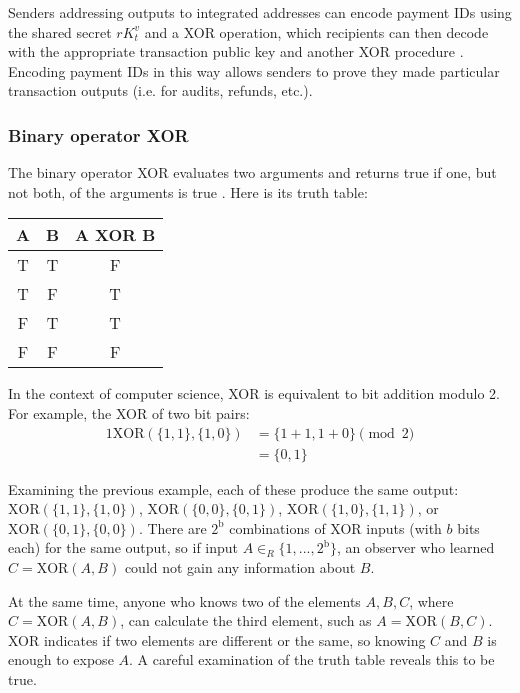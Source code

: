 Senders addressing outputs to integrated addresses can encode payment IDs using the shared secret $r K_t^v$ and a XOR operation, which recipients can then decode with the appropriate transaction public key and another XOR procedure \cite{integrated-addresses}. Encoding payment IDs in this way allows senders to prove they made particular transaction outputs (i.e. for audits, refunds, etc.).
    
\subsubsection*{Binary operator XOR}

The binary operator XOR evaluates two arguments and returns true if one, but not both, of the arguments is true \cite{wolfram-xor}. Here is its truth table:

\begin{center}
    \begin{tabular}{|c|c|c|}
    \hline
        A & B & A XOR B \\
    \hline\hline
        T & T & F \\
    \hline
        T & F & T \\
    \hline
        F & T & T \\
    \hline
        F & F & F \\
    \hline
    \end{tabular}
\end{center}

In the context of computer science, XOR is equivalent to bit addition modulo 2. For example, the XOR of two bit pairs:
\begin{alignat*}{1}
    \text{XOR}(\{1,1\},\{1,0\}) &= \{1+1,1+0\} \pmod 2 \\
                                &= \{0,1\} 
\end{alignat*}

Examining the previous example, each of these produce the same output: $\text{XOR}(\{1,1\},\{1,0\})$, $\text{XOR}(\{0,0\},\{0,1\})$, $\text{XOR}(\{1,0\},\{1,1\})$, or $\text{XOR}(\{0,1\},\{0,0\})$. There are $2^{\text{b}}$ combinations of XOR inputs (with $b$ bits each) for the same output, so if input $A \in_R \{1,...,2^{\text{b}}\}$, an observer who learned $C = \text{XOR}(A,B)$ could not gain any information about $B$.

At the same time, anyone who knows two of the elements $A,B,C$, where $C = \text{XOR}(A,B)$, can calculate the third element, such as $A = \text{XOR}(B,C)$. XOR indicates if two elements are different or the same, so knowing $C$ and $B$ is enough to expose $A$. A careful examination of the truth table reveals this to be true.
    
